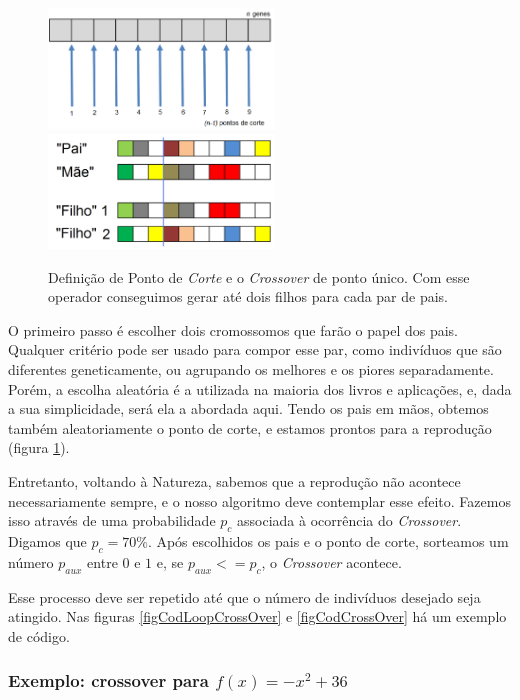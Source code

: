 	\begin{figure}[htp]
		\begin{center}
			\includegraphics[width=6cm]{figs/ga/PontosCorte.png}
			\includegraphics[width=6cm]{figs/ga/CrossOver.png}
		\end{center}
		\caption{\label{figCrossOver}Definição de Ponto de \textit{Corte} e o \textit{Crossover} de ponto único. Com esse operador conseguimos gerar até dois filhos para cada par de pais.}
	\end{figure}
	
	O primeiro passo é escolher dois cromossomos que farão o papel dos pais. Qualquer critério pode ser usado para compor esse par, como indivíduos que são diferentes geneticamente, ou agrupando os melhores e os piores separadamente. Porém, a escolha aleatória é a utilizada na maioria dos livros e aplicações, e, dada a sua simplicidade, será ela a abordada aqui. Tendo os pais em mãos, obtemos também aleatoriamente o ponto de corte, e estamos prontos para a reprodução (figura \ref{figCrossOver}). 
	
	Entretanto, voltando à Natureza, sabemos que a reprodução não acontece necessariamente sempre, e o nosso algoritmo deve contemplar esse efeito. Fazemos isso através de uma probabilidade $p_c$ associada à ocorrência do \textit{Crossover}. Digamos que $p_c = 70\%$. Após escolhidos os pais e o ponto de corte, sorteamos um número $p_{aux}$ entre $0$ e $1$ e, se $p_{aux} <= p_c$, o \textit{Crossover} acontece.
	
	Esse processo deve ser repetido até que o número de indivíduos desejado seja atingido. Nas figuras \ref{figCodLoopCrossOver} e \ref{figCodCrossOver} há um exemplo de código.
	
	\subsubsection{Exemplo: crossover para $f(x) = -x^2 + 36$}
	

